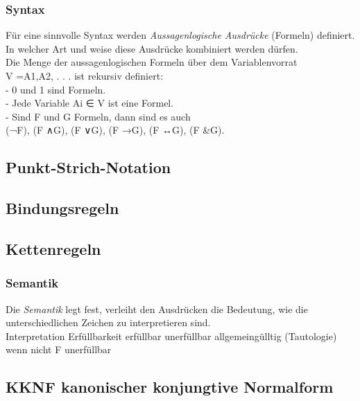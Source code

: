 \subsubsection{Syntax}
Für eine sinnvolle Syntax werden \textit{Aussagenlogische Ausdrücke} (Formeln) definiert. In welcher Art und weise diese Ausdrücke kombiniert werden dürfen.\\

Die Menge der aussagenlogischen Formeln über dem Variablenvorrat\\
V ={A1,A2, . . .} ist rekursiv definiert:\\
- 0 und 1 sind Formeln.\\
- Jede Variable Ai ∈ V ist eine Formel.\\
- Sind F und G Formeln, dann sind es auch\\
(¬F), (F ∧G), (F ∨G), (F →G), (F ↔G), (F &G).\\



\subsection{Punkt-Strich-Notation}
\subsection{Bindungsregeln}
\subsection{Kettenregeln}



\subsubsection{Semantik}
Die \textit{Semantik} legt fest, verleiht den Ausdrücken die Bedeutung, wie die unterschiedlichen Zeichen zu interpretieren sind.\\

Interpretation
Erfüllbarkeit
erfüllbar
unerfüllbar
allgemeingülltig (Tautologie) wenn nicht F unerfüllbar

\subsection{KKNF kanonischer konjungtive Normalform}



